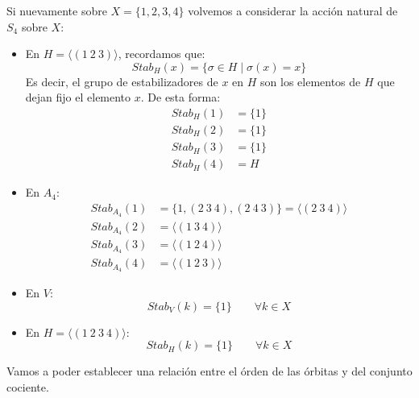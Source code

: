 \begin{ejemplo}
    Si nuevamente sobre $X = \{1,2,3,4\}$ volvemos a considerar la acción natural de $S_4$ sobre $X$:
    \begin{itemize}
        \item En $H = \langle (1\ 2\ 3) \rangle $, recordamos que:
            \begin{equation*}
                Stab_H(x) = \{\sigma\in H \mid \sigma(x) = x\}
            \end{equation*}
            Es decir, el grupo de estabilizadores de $x$ en $H$ son los elementos de $H$ que dejan fijo el elemento $x$. De esta forma:
            \begin{align*}
                Stab_H(1) &= \{1\} \\
                Stab_H(2) &= \{1\} \\
                Stab_H(3) &= \{1\} \\
                Stab_H(4) &= H
            \end{align*}
        \item En $A_4$:
            \begin{align*}
                Stab_{A_4}(1) &= \{1, (2\ 3\ 4), (2\ 4\ 3)\} = \langle (2\ 3\ 4) \rangle  \\
                Stab_{A_4}(2) &= \langle (1\ 3\ 4) \rangle  \\
                Stab_{A_4}(3) &= \langle (1\ 2\ 4) \rangle  \\
                Stab_{A_4}(4) &= \langle (1\ 2\ 3) \rangle  
            \end{align*}
        \item En $V$:
            \begin{equation*}
                Stab_V(k) = \{1\} \qquad \forall k\in X
            \end{equation*}
        \item En $H = \langle (1\ 2\ 3\ 4) \rangle $:
            \begin{equation*}
                Stab_H(k) = \{1\} \qquad \forall k\in X
            \end{equation*}
    \end{itemize}
\end{ejemplo}

\noindent
Vamos a poder establecer una relación entre el órden de las órbitas y del conjunto cociente.

